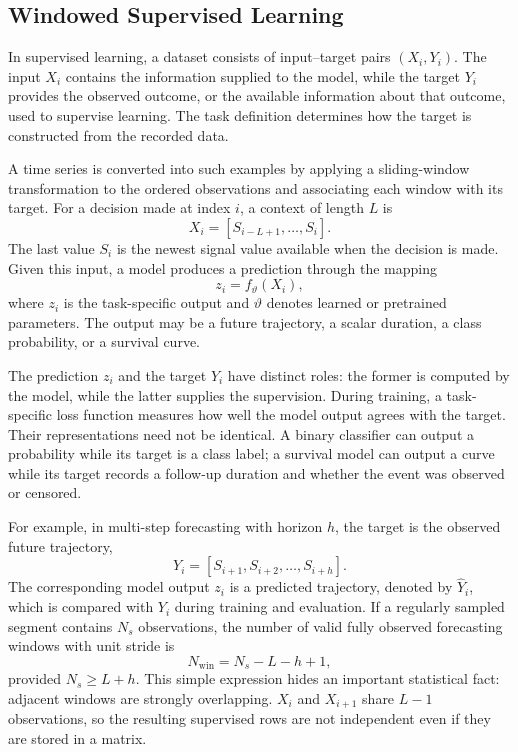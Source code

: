 \subsection{Windowed Supervised Learning}

In supervised learning, a dataset consists of input--target pairs \((X_i,Y_i)\).
The input \(X_i\) contains the information supplied to the model, while the
target \(Y_i\) provides the observed outcome, or the available information about
that outcome, used to supervise learning. The task definition determines how
the target is constructed from the recorded data.

A time series is converted into such examples by applying a sliding-window
transformation to the ordered observations and associating each window with its
target. For a decision made at index \(i\), a context of length \(L\) is
\[
  X_i = [S_{i-L+1}, \ldots, S_i].
\]
The last value \(S_i\) is the newest signal value available when the decision is
made. Given this input, a model produces a prediction through the mapping
\[
  z_i = f_\vartheta(X_i),
\]
where \(z_i\) is the task-specific output and \(\vartheta\) denotes learned or
pretrained parameters. The output may be a future trajectory, a scalar duration,
a class probability, or a survival curve.

The prediction \(z_i\) and the target \(Y_i\) have distinct roles: the former is
computed by the model, while the latter supplies the supervision. During
training, a task-specific loss function measures how well the model output
agrees with the target. Their representations need not be identical. A binary
classifier can output a probability while its target is a class label; a
survival model can output a curve while its target records a follow-up duration
and whether the event was observed or censored.

For example, in multi-step forecasting with horizon \(h\), the target is the
observed future trajectory,
\[
  Y_i = [S_{i+1},S_{i+2},\ldots,S_{i+h}] .
\]
The corresponding model output \(z_i\) is a predicted trajectory, denoted by
\(\widehat{Y}_i\), which is compared with \(Y_i\) during training and evaluation.
If a regularly sampled segment contains \(N_s\) observations, the number of
valid fully observed forecasting windows with unit stride is
\[
  N_{\mathrm{win}} = N_s - L - h + 1 ,
\]
provided \(N_s \ge L+h\). This simple expression hides an important statistical
fact: adjacent windows are strongly overlapping. \(X_i\) and \(X_{i+1}\) share
\(L-1\) observations, so the resulting supervised rows are not independent even
if they are stored in a matrix.

